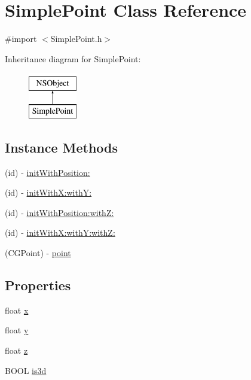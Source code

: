 \hypertarget{interface_simple_point}{\section{Simple\-Point Class Reference}
\label{d9/dc7/interface_simple_point}
}


{\ttfamily \#import $<$Simple\-Point.\-h$>$}

Inheritance diagram for Simple\-Point\-:\begin{figure}[H]
\begin{center}
\leavevmode
\includegraphics[height=2.000000cm]{d9/dc7/interface_simple_point}
\end{center}
\end{figure}
\subsection*{Instance Methods}
\begin{DoxyCompactItemize}
\item 
(id) -\/ \hyperlink{interface_simple_point_aa138ca80c0a7a5fa1684c38483042a76}{init\-With\-Position\-:}
\item 
(id) -\/ \hyperlink{interface_simple_point_a9ded444176a17c3ff2c398c17e6c7c74}{init\-With\-X\-:with\-Y\-:}
\item 
(id) -\/ \hyperlink{interface_simple_point_a24776a0473601bcdf437ba02dbc89d5c}{init\-With\-Position\-:with\-Z\-:}
\item 
(id) -\/ \hyperlink{interface_simple_point_afb23073d7d7146f85e0dec2029c962d0}{init\-With\-X\-:with\-Y\-:with\-Z\-:}
\item 
(C\-G\-Point) -\/ \hyperlink{interface_simple_point_a2f2ec1990349aa281ea9003c2d7e320b}{point}
\end{DoxyCompactItemize}
\subsection*{Properties}
\begin{DoxyCompactItemize}
\item 
float \hyperlink{interface_simple_point_abb16aaf6215e9e946606b30199b1c3af}{x}
\item 
float \hyperlink{interface_simple_point_ae10ba2c5156e6061258a0720443cd1c8}{y}
\item 
float \hyperlink{interface_simple_point_ad74ae8e5d653579e791c040155e7d4d6}{z}
\item 
B\-O\-O\-L \hyperlink{interface_simple_point_ad56fae41f389d3c12b4023c3e797f452}{is3d}
\end{DoxyCompactItemize}


